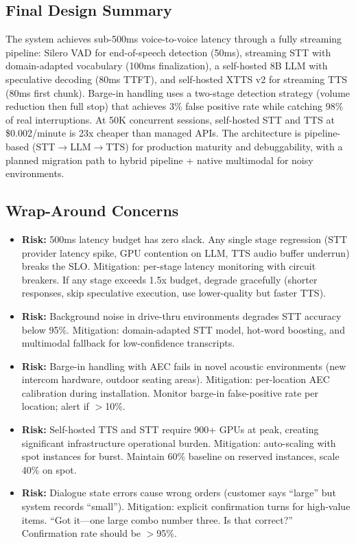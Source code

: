 \subsection*{Final Design Summary}

The system achieves sub-500ms voice-to-voice latency through a fully streaming pipeline: Silero VAD for end-of-speech detection (50ms), streaming STT with domain-adapted vocabulary (100ms finalization), a self-hosted 8B LLM with speculative decoding (80ms TTFT), and self-hosted XTTS v2 for streaming TTS (80ms first chunk). Barge-in handling uses a two-stage detection strategy (volume reduction then full stop) that achieves 3\% false positive rate while catching 98\% of real interruptions. At 50K concurrent sessions, self-hosted STT and TTS at \$0.002/minute is 23x cheaper than managed APIs. The architecture is pipeline-based (STT$\rightarrow$LLM$\rightarrow$TTS) for production maturity and debuggability, with a planned migration path to hybrid pipeline + native multimodal for noisy environments.

\subsection*{Wrap-Around Concerns}
\begin{itemize}
  \item \textbf{Risk:} 500ms latency budget has zero slack. Any single stage regression (STT provider latency spike, GPU contention on LLM, TTS audio buffer underrun) breaks the SLO. Mitigation: per-stage latency monitoring with circuit breakers. If any stage exceeds 1.5x budget, degrade gracefully (shorter responses, skip speculative execution, use lower-quality but faster TTS).
  \item \textbf{Risk:} Background noise in drive-thru environments degrades STT accuracy below 95\%. Mitigation: domain-adapted STT model, hot-word boosting, and multimodal fallback for low-confidence transcripts.
  \item \textbf{Risk:} Barge-in handling with AEC fails in novel acoustic environments (new intercom hardware, outdoor seating areas). Mitigation: per-location AEC calibration during installation. Monitor barge-in false-positive rate per location; alert if $>$10\%.
  \item \textbf{Risk:} Self-hosted TTS and STT require 900+ GPUs at peak, creating significant infrastructure operational burden. Mitigation: auto-scaling with spot instances for burst. Maintain 60\% baseline on reserved instances, scale 40\% on spot.
  \item \textbf{Risk:} Dialogue state errors cause wrong orders (customer says ``large'' but system records ``small''). Mitigation: explicit confirmation turns for high-value items. ``Got it---one large combo number three. Is that correct?'' Confirmation rate should be $>$95\%.
\end{itemize}

